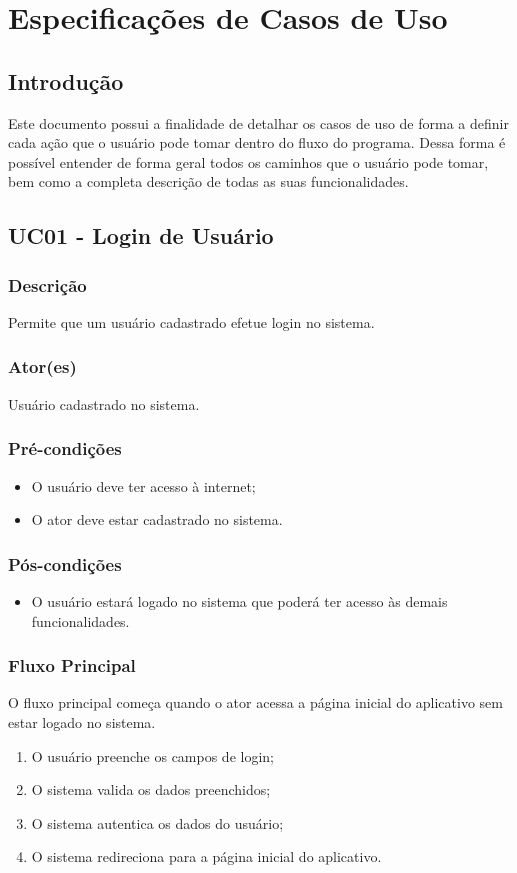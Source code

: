 \chapter{Especificações de Casos de Uso}

\section*{Introdução}
    Este documento possui a finalidade de detalhar os casos de uso de forma a definir cada ação que o usuário pode tomar dentro do fluxo do programa. Dessa forma é possível entender de forma geral todos os caminhos que o usuário pode tomar, bem como a completa descrição de todas as suas funcionalidades.

\section{UC01 \-- Login de Usuário}
    \subsection{Descrição}
        Permite que um usuário cadastrado efetue login no sistema.
    \subsection{Ator(es)}
        Usuário cadastrado no sistema.
    \subsection{Pré-condições}
        \begin{itemize}
            \item O usuário deve ter acesso à internet;
            \item O ator deve estar cadastrado no sistema.
        \end{itemize}
    \subsection{Pós-condições}
        \begin{itemize}
            \item O usuário estará logado no sistema que poderá ter acesso às demais funcionalidades.
        \end{itemize}
    \subsection{Fluxo Principal}
        O fluxo principal começa quando o ator acessa a página inicial do aplicativo sem estar logado no sistema.
        \begin{enumerate}
            \item O usuário preenche os campos de login;
            \item O sistema valida os dados preenchidos;
            \item O sistema autentica os dados do usuário;
            \item O sistema redireciona para a página inicial do aplicativo.
        \end{enumerate}
